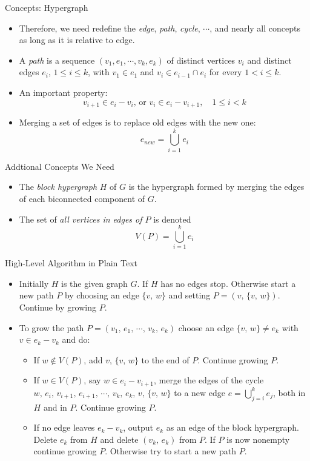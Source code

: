 \documentclass{beamer}
\begin{document}
\begin{frame}{Concepts: Hypergraph}
	\begin{itemize}
		\item
		Therefore, we need redefine the \emph{edge}, \emph{path}, \emph{cycle}, $\cdots$, 
		and nearly all concepts as long as it is relative to edge.
		\item
		A \emph{path} is a sequence $(v_1, e_1, \cdots, v_k, e_k)$ of distinct vertices
		$v_i$ and distinct edges $e_i$, $1\leq i\leq k$, with $v_1\in e_1$ and $v_i\in e_{i-1}\cap e_i$
		for every $1 < i\leq k$.
		\item
		An important property:
		$$v_{i+1}\in e_i-v_i \text{, or } v_{i}\in e_i-v_{i+1}, \quad 1\leq i < k$$
		\item
		Merging a set of edges is to replace old edges with the new one:
		$$e_{new}=\bigcup_{i=1}^ke_i$$
	\end{itemize}
\end{frame}

\begin{frame}{Addtional Concepts We Need}
	\begin{itemize}
		\item
		The \emph{block hypergraph} $H$ of $G$ is the hypergraph formed by merging the edges of each biconnected component of $G$.
		\item
		The set of \emph{all vertices in edges of $P$} is denoted
		$$V(P)=\bigcup_{i=1}^ke_i$$
	\end{itemize}
\end{frame}

\begin{frame}{High-Level Algorithm in Plain Text}
	\begin{itemize}
		\item
		Initially $H$ is the given graph $G$. If $H$ has no edges stop. Otherwise start a new path $P$ by choosing an edge 
		$\{v,\,w\}$ and setting $P=(v,\,\{v,\,w\})$. Continue by growing $P$.
		\item
		To grow the path $P=(v_1,\,e_1,\,\cdots,\,v_k,\,e_k)$ choose an edge $\{v,\,w\}\neq e_k$ with $v\in e_k-v_k$ and do:
		\begin{itemize}
			\item
			If $w\notin V(P)$, add $v,\,\{v,\,w\}$ to the end of $P$. Continue growing $P$.
			\item
			If $w\in V(P)$, say $w\in e_i-v_{i+1}$, merge the edges of the cycle $w,\,e_i,\,v_{i+1},\,e_{i+1},\,\cdots,\,v_k,\,e_k,\,v,\,\{v,\,w\}$
			to a new edge $e=\bigcup_{j=i}^ke_j$, both in $H$ and in $P$. Continue growing $P$.
			\item
			If no edge leaves $e_k-v_k$, output $e_k$ as an edge of the block hypergraph. Delete $e_k$ from $H$ and delete $(v_k,\,e_k)$
			from $P$. If $P$ is now nonempty continue growing $P$. Otherwise try to start a new path $P$.
		\end{itemize}
	\end{itemize}
\end{frame}
\end{document}
